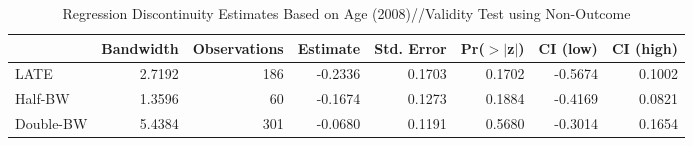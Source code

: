 \begin{table}[ht]
\centering
\begin{tabular}{lrrrrrrr}
  \hline
 & Bandwidth & Observations & Estimate & Std. Error & Pr($>$$|$z$|$) & CI (low) & CI (high) \\ 
  \hline
LATE & 2.7192 & 186 & -0.2336 & 0.1703 & 0.1702 & -0.5674 & 0.1002 \\ 
  Half-BW & 1.3596 & 60 & -0.1674 & 0.1273 & 0.1884 & -0.4169 & 0.0821 \\ 
  Double-BW & 5.4384 & 301 & -0.0680 & 0.1191 & 0.5680 & -0.3014 & 0.1654 \\ 
   \hline
\end{tabular}
\caption{Regression Discontinuity Estimates Based on Age (2008)//Validity Test using Non-Outcome} 
\label{tab:rd2008y_non}
\end{table}
